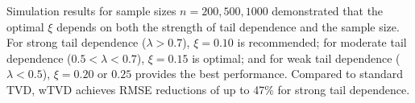 \documentclass[twoside]{article}
\begin{document}
Simulation results for sample sizes $n = 200, 500, 1000$ demonstrated that the optimal $\xi$ depends on both the strength of tail dependence and the sample size. For strong tail dependence ($\lambda > 0.7$), $\xi = 0.10$ is recommended; for moderate tail dependence ($0.5 < \lambda < 0.7$), $\xi = 0.15$ is optimal; and for weak tail dependence ($\lambda < 0.5$), $\xi = 0.20$ or $0.25$ provides the best performance. Compared to standard TVD, wTVD achieves RMSE reductions of up to 47\% for strong tail dependence.


%
\end{document}
